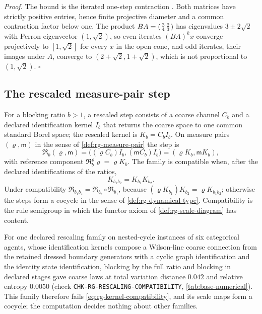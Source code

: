 \noindent\emph{Proof.}
The bound is the iterated one-step contraction
\citep{Birkhoff1957,nussbaum1988hilbert}. Both matrices have strictly positive
entries, hence finite projective diameter and a common contraction factor
below one. The product
\(BA=\begin{psmallmatrix}3&2\\4&3\end{psmallmatrix}\) has eigenvalues
\(3\pm2\sqrt2\) with Perron eigenvector \((1,\sqrt2)\), so even iterates
\((BA)^kx\) converge projectively to \([1,\sqrt2]\) for every \(x\) in the open
cone, and odd iterates, their images under \(A\), converge to
\((2+\sqrt2,1+\sqrt2)\), which is not proportional to \((1,\sqrt2)\).
\(\square\)

\subsection{The rescaled measure-pair step}

For a blocking ratio \(b>1\), a rescaled step consists of a coarse channel
\(C_b\) and a declared identification kernel \(I_b\) that returns the coarse
space to one common standard Borel space; the rescaled kernel is
\(K_b=C_bI_b\). On measure pairs \((\varrho,\mathsf m)\) in the sense of
\cref{def:rg-measure-pair} the step is
\begin{equation}
\mathfrak R_b(\varrho,\mathsf m)
=\bigl((\varrho C_b)I_b,(\mathsf mC_b)I_b\bigr)
=(\varrho K_b,\mathsf mK_b),
\label{eq:rg-measure-pair-map}
\end{equation}
with reference component \(\mathfrak R^\varrho_b\varrho=\varrho K_b\). The family is
compatible when, after the declared identifications of the ratios,
\begin{equation}
K_{b_1b_2}=K_{b_1}K_{b_2}.
\label{eq:rg-kernel-compatibility}
\end{equation}
Under compatibility
\(\mathfrak R_{b_1b_2}=\mathfrak R_{b_2}\circ\mathfrak R_{b_1}\), because
\((\varrho K_{b_1})K_{b_2}=\varrho K_{b_1b_2}\); otherwise the steps form a cocycle
in the sense of \cref{def:rg-dynamical-type}. Compatibility is the rule
semigroup in which the functor axiom of \cref{def:rg-scale-diagram} has
content.

For one declared rescaling family on nested-cycle instances of six categorical
agents, whose identification kernels compose a Wilson-line coarse connection
from the retained dressed boundary generators with a cyclic graph
identification and the identity state identification, blocking by the full
ratio and blocking in declared stages gave coarse laws at total variation
distance \(0.042\) and relative entropy \(0.0050\) (check
\texttt{CHK-RG-RESCALING-COMPATIBILITY}, \cref{tab:base-numerical}). This
family therefore fails \eqref{eq:rg-kernel-compatibility}, and its scale maps
form a cocycle; the computation decides nothing about other families.

